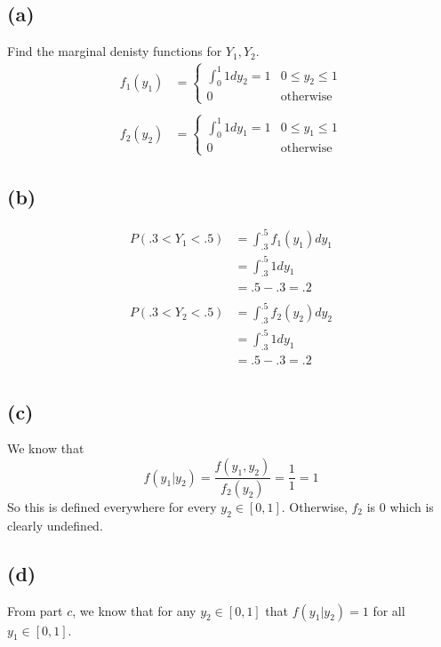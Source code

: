 \documentclass{article}
\theoremstyle{definition}
\begin{document}
    \subsection*{(a)} Find the marginal denisty functions for $Y_1, Y_2$.
        \begin{align*}
            f_1(y_1) &= 
            \begin{cases}
                \int_0^1 1 dy_2 = 1 & 0 \leqslant y_2 \leqslant 1 \\
                0 & \text{otherwise}    
            \end{cases}\\\\
            f_2(y_2) &= 
            \begin{cases}
                \int_0^1 1 dy_1 = 1 & 0 \leqslant y_1 \leqslant 1 \\
                0 & \text{otherwise}    
            \end{cases}
        \end{align*}

    \subsection*{(b)}
        \begin{align*}
            P(.3 < Y_1 < .5) &= \int_{.3}^{.5} f_1(y_1) dy_1 \\
            &= \int_{.3}^{.5} 1 dy_1 \\ &= .5 - .3 = .2\\\\
            P(.3 < Y_2 < .5) &= \int_{.3}^{.5} f_2(y_2) dy_2 \\
            &= \int_{.3}^{.5} 1 dy_1 \\ &= .5 - .3 = .2\\
        \end{align*}

    \subsection*{(c)}
        We know that 
        \[
            f(y_1|y_2) = \frac{f(y_1, y_2)}{f_2(y_2)} = \frac{1}{1} = 1
        \]
        So this is defined everywhere for every $y_2 \in [0,1]$. Otherwise, $f_2$ is 0 which 
        is clearly undefined.

    \subsection*{(d)}
        From part $c$, we know that for any $y_2 \in [0,1]$ that $f(y_1|y_2) = 1$ for all $y_1 \in [0,1]$.
    
\end{document}
